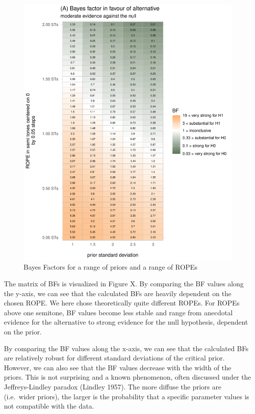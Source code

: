 \documentclass[
  doc,
  longtable,
  nolmodern,
  notxfonts,
  notimes,
  colorlinks=true,linkcolor=blue,citecolor=blue,urlcolor=blue]{apa7}
\begin{document}
\begin{figure}[H]

\caption{Bayes Factors for a range of priors and a range of ROPEs}

{\centering \includegraphics{manuscript_files/figure-pdf/visualize-raster-1.pdf}

}

\end{figure}%

The matrix of BFs is visualized in Figure X. By comparing the BF values
along the y-axis, we can see that the calculated BFs are heavily
dependent on the chosen ROPE. We here chose theoretically quite
different ROPEs. For ROPEs above one semitone, BF values become less
stable and range from anecdotal evidence for the alternative to strong
evidence for the null hypothesis, dependent on the prior.

By comparing the BF values along the x-axis, we can see that the
calculated BFs are relatively robust for different standard deviations
of the critical prior. However, we can also see that the BF values
decrease with the width of the priors. This is not surprising and a
known phenomenon, often discussed under the Jeffreys-Lindley paradox
(Lindley 1957). The more diffuse the priors are (i.e.~wider priors), the
larger is the probability that a specific parameter values is not
compatible with the data.
\end{document}
